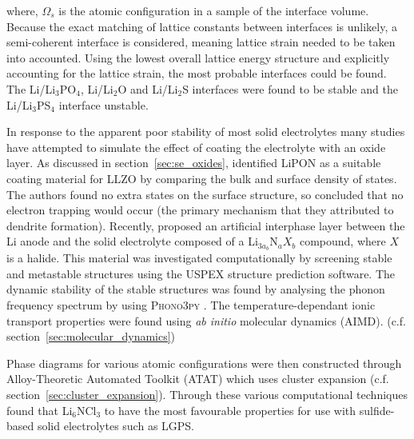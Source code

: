 \documentclass[../main.tex]{subfiles}
\begin{document}
where, $\Omega_s$ is the atomic configuration in a sample of the interface volume. Because the exact matching of lattice constants between interfaces is unlikely, a semi-coherent interface is considered, meaning lattice strain needed to be taken into accounted. Using the lowest overall lattice energy structure and explicitly accounting for the lattice strain, the most probable interfaces could be found. The Li/Li$_3$PO$_4$, Li/Li$_2$O and Li/Li$_2$S interfaces were found to be stable and the Li/Li$_3$PS$_4$ interface unstable.\cite{Lepley2015}

In response to the apparent poor stability of most solid electrolytes many studies have attempted to simulate the effect of coating the electrolyte with an oxide layer\cite{Zhang2020directvis, Xiao2019coat, Tian2018}. As discussed in section~\ref{sec:se_oxides}, \citeauthor{Tian2018} identified LiPON as a suitable coating material for LLZO by comparing the bulk and surface density of states\cite{Tian2018}. The authors found no extra states on the surface structure, so concluded that no electron trapping would occur (the primary mechanism that they attributed to dendrite formation). Recently, \citeauthor{Sang2020} proposed an artificial interphase layer between the Li anode and the solid electrolyte composed of a Li$_{3a_b}$N$_{a}X_{b}$ compound, where $X$ is a halide.\cite{Sang2020} 
This material was investigated computationally by screening stable and metastable structures using the USPEX structure prediction software.\cite{Glass2006, Oganov2006} The dynamic stability of the stable structures was found by analysing the phonon frequency spectrum by using \textsc{Phono3py} \cite{Parlinski1997, Togo2008,togo_distributions_2015}. The temperature-dependant ionic transport properties were found using \textit{ab initio} molecular dynamics (AIMD). (c.f. section~\ref{sec:molecular_dynamics})

Phase diagrams for various atomic configurations were then constructed through Alloy-Theoretic Automated Toolkit (ATAT) which uses cluster expansion (c.f. section~\ref{sec:cluster_expansion}).\cite{Hart2008, VandeWalle2002} Through these various computational techniques \citeauthor{Sang2020} found that Li$_6$NCl$_3$ to have the most favourable properties for use with sulfide-based solid electrolytes such as LGPS.\cite{Sang2020}
\end{document}
